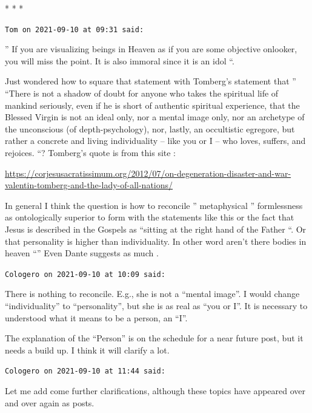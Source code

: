 
\begin{center}* * *\end{center}

\begin{footnotesize}\begin{sffamily}

\texttt{Tom on 2021-09-10 at 09:31 said: }

” If you are visualizing beings in Heaven as if you are some objective onlooker, you will miss the point. It is also immoral since it is an idol “.

Just wondered how to square that statement with Tomberg's statement that ” “There is not a shadow of doubt for anyone who takes the spiritual life of mankind seriously, even if he is short of authentic spiritual experience, that the Blessed Virgin is not an ideal only, nor a mental image only, nor an archetype of the unconscious (of depth-psychology), nor, lastly, an occultistic egregore, but rather a concrete and living individuality – like you or I – who loves, suffers, and rejoices. “?\newline
Tomberg's quote is from this site :

\url{https://corjesusacratissimum.org/2012/07/on-degeneration-disaster-and-war-valentin-tomberg-and-the-lady-of-all-nations/}

In general I think the question is how to reconcile ” metaphysical ” formlessness as ontologically superior to form with the statements like this or the fact that Jesus is described in the Gospels as “sitting at the right hand of the Father “. Or that personality is higher than individuality. In other word aren't there bodies in heaven “” Even Dante suggests as much .


\hfill

\texttt{Cologero on 2021-09-10 at 10:09 said: }

There is nothing to reconcile. E.g., she is not a “mental image”. I would change “individuality” to “personality”, but she is as real as “you or I”. It is necessary to understood what it means to be a person, an “I”.

The explanation of the “Person” is on the schedule for a near future post, but it needs a build up. I think it will clarify a lot.


\hfill

\texttt{Cologero on 2021-09-10 at 11:44 said: }

Let me add come further clarifications, although these topics have appeared over and over again as posts.


\end{sffamily}
\end{footnotesize}
